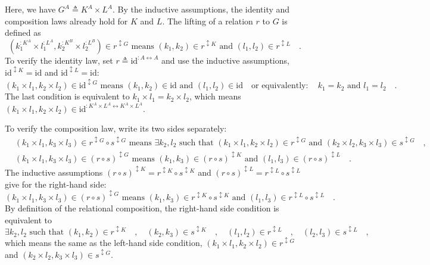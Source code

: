 Here, we have $G^{A}\triangleq K^{A}\times L^{A}$. By the inductive
assumptions, the identity and composition laws already hold for $K$
and $L$. The lifting of a relation $r$ to $G$ is defined as
\[
(k_{1}^{:K^{A}}\times l_{1}^{:L^{A}},k_{2}^{:K^{B}}\times l_{2}^{:L^{B}})\in r^{\updownarrow G}\text{ means }(k_{1},k_{2})\in r^{\updownarrow K}\text{ and }(l_{1},l_{2})\in r^{\updownarrow L}\quad.
\]
To verify the identity law, set $r\triangleq\text{id}^{:A\leftrightarrow A}$
and use the inductive assumptions, $\text{id}^{\updownarrow K}=\text{id}$
and $\text{id}^{\updownarrow L}=\text{id}$:
\[
(k_{1}\times l_{1},k_{2}\times l_{2})\in\text{id}^{\updownarrow G}\text{ means }(k_{1},k_{2})\in\text{id}\text{ and }(l_{1},l_{2})\in\text{id}\quad\text{or equivalently}:\quad k_{1}=k_{2}\text{ and }l_{1}=l_{2}\quad.
\]
The last condition is equivalent to $k_{1}\times l_{1}=k_{2}\times l_{2}$,
which means $(k_{1}\times l_{1},k_{2}\times l_{2})\in\text{id}^{:K^{A}\times L^{A}\leftrightarrow K^{A}\times L^{A}}$.

To verify the composition law, write its two sides separately:
\begin{align*}
 & (k_{1}\times l_{1},k_{3}\times l_{3})\in r^{\updownarrow G}\circ s^{\updownarrow G}\text{ means }\exists k_{2},l_{2}\text{ such that }(k_{1}\times l_{1},k_{2}\times l_{2})\in r^{\updownarrow G}\text{ and }(k_{2}\times l_{2},k_{3}\times l_{3})\in s^{\updownarrow G}\quad,\\
 & (k_{1}\times l_{1},k_{3}\times l_{3})\in(r\circ s)^{\updownarrow G}\text{ means }(k_{1},k_{3})\in(r\circ s)^{\updownarrow K}\text{ and }(l_{1},l_{3})\in(r\circ s)^{\updownarrow L}\quad.
\end{align*}
The inductive assumptions $(r\circ s)^{\updownarrow K}=r^{\updownarrow K}\circ s^{\updownarrow K}$
and $(r\circ s)^{\updownarrow L}=r^{\updownarrow L}\circ s^{\updownarrow L}$
give for the right-hand side:
\[
(k_{1}\times l_{1},k_{3}\times l_{3})\in(r\circ s)^{\updownarrow G}\text{ means }(k_{1},k_{3})\in r^{\updownarrow K}\circ s^{\updownarrow K}\text{ and }(l_{1},l_{3})\in r^{\updownarrow L}\circ s^{\updownarrow L}\quad.
\]
By definition of the relational composition, the right-hand side condition
is equivalent to
\[
\exists k_{2},l_{2}\text{ such that }(k_{1},k_{2})\in r^{\updownarrow K}\quad,\quad(k_{2},k_{3})\in s^{\updownarrow K}\quad,\quad(l_{1},l_{2})\in r^{\updownarrow L}\quad,\quad(l_{2},l_{3})\in s^{\updownarrow L}\quad,
\]
which means the same as the left-hand side condition, $(k_{1}\times l_{1},k_{2}\times l_{2})\in r^{\updownarrow G}$
and $(k_{2}\times l_{2},k_{3}\times l_{3})\in s^{\updownarrow G}$.

